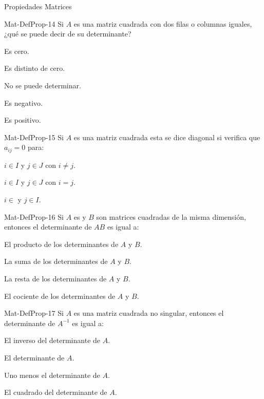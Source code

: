\documentclass[a4,11pt]{aleph-notas}
\begin{document}
\begin{quiz}{Propiedades Matrices}
\begin{multi}[]%
    {Mat-DefProp-14}
    Si $A$ es una matriz cuadrada con dos filas o columnas iguales, ¿qué se puede decir de su determinante?
    \item* Es cero.
    \item Es distinto de cero.
    \item No se puede determinar.
    \item Es negativo.
    \item Es positivo.
\end{multi}

\begin{multi}[]%
    {Mat-DefProp-15}
    Si $A$ es una matriz cuadrada esta se dice diagonal si verifica que $a_{ij}=0$ para:
    \item* $i\in I$ y $j\in J$ con $i\neq j$.
    \item $i\in I$ y $j\in J$ con $i=j$.
    \item $i\in $ y $j\in I$.
\end{multi}

\begin{multi}[]%
    {Mat-DefProp-16}
    Si $A$ es y $B$ son matrices cuadradas de la misma dimensión, entonces el determinante de $AB$ es igual a:
    \item* El producto de los determinantes de $A$ y $B$.
    \item La suma de los determinantes de $A$ y $B$.
    \item La resta de los determinantes de $A$ y $B$.
    \item El cociente de los determinantes de $A$ y $B$.
\end{multi}

\begin{multi}[]%
    {Mat-DefProp-17}
    Si $A$ es una matriz cuadrada no singular, entonces el determinante de $A^{-1}$ es igual a:
    \item* El inverso del determinante de $A$.
    \item El determinante de $A$.
    \item Uno menos el determinante de $A$.
    \item El cuadrado del determinante de $A$.
\end{multi}

\end{quiz}
\end{document}
